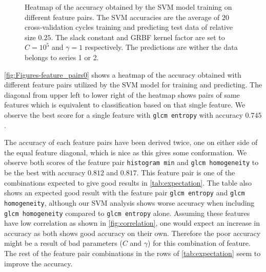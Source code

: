 \begin{figure}[H]
\centering
{}
\caption{Heatmap of the accuracy obtained by the SVM model training on different feature pairs. The SVM accuracies are the average 
of $20$ cross-validation cycles training and predicting test data of relative size $0.25$.
The slack constant and GRBF kernel factor are set to $C=10^5$ and $\gamma=1 $ respectively.
 The predictions are wither the data belongs to series 1 or 2.}
\label{fig:Figures-feature_pairs0}
\end{figure}

\autoref{fig:Figures-feature_pairs0} shows a heatmap of the accuracy obtained with different 
feature pairs utilized by the SVM model for training and predicting. The diagonal from upper left 
to lower right of the heatmap shows pairs of same features which is equivalent to classification 
based on that single feature. We observe the best score for a single feature with \verb|glcm entropy|
with accuracy $0.745$.

The accuracy of each feature pairs have been derived twice, one on either side of the equal feature diagonal, which is nice as 
this gives some conformation. We observe both scores of the feature pair \verb|histogram min| and \verb|glcm homogeneity| 
to be the best with accuracy $0.812$ and $0.817$. This feature pair is one of the combinations 
expected to give good results in \autoref{tab:expectation}. The table also shows an expected 
good result with the feature pair \verb|glcm entropy| and \verb|glcm homogeneity|, although 
our SVM analysis shows worse accuracy when including \verb|glcm homogeneity| compared to \verb|glcm entropy| 
alone. Assuming these features have low correlation as shown in \autoref{fig:correlation}, one would expect 
an increase in accuracy as both shows good accuracy on their own. Therefore the poor accuracy 
might be a result of bad parameters ($C$ and $\gamma $) for this combination of feature. The rest of the 
feature pair combinations in the rows of \autoref{tab:expectation} seem to improve the accuracy. 

